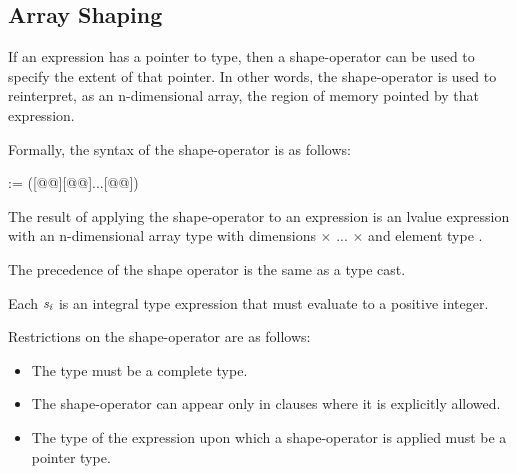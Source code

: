 \begin{ccppspecific}
\section{Array Shaping}
\label{sec:Array Shaping}


If an expression has a pointer to  type, then a shape-operator can be
used to specify the extent of that pointer. In other words, the
shape-operator is used to reinterpret, as an n-dimensional array, the region of
memory pointed by that expression.

Formally, the syntax of the shape-operator is as follows:
\begin{indentedcodelist}
 := ([@\textsubscript{}@\plc{}][@\textsubscript{}@]...[@\textsubscript{}@])
\end{indentedcodelist}

The result of applying the shape-operator to an expression is an lvalue
expression with an n-dimensional array type with dimensions
\textsubscript{} $\times$ \textsubscript{} ...
$\times$ \textsubscript{} and element type .

The precedence of the shape operator is the same as a type cast.

Each $\plc{s}_\plc{i}$ is an integral type expression that must evaluate to a positive integer.

\restrictions
Restrictions on the shape-operator are as follows:

\begin{itemize}
\item The  type must be a complete type.

\item The shape-operator can appear only in clauses where it is explicitly allowed.

\item The type of the expression upon which a shape-operator is applied must be a pointer type.


\end{itemize}
\end{ccppspecific}






